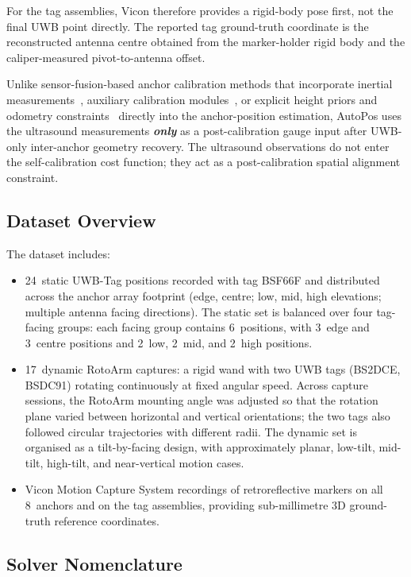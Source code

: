 \documentclass[11pt,a4paper]{article}
\begin{document}
For the tag assemblies, Vicon therefore provides a rigid-body pose first, not the final UWB point directly.
The reported tag ground-truth coordinate is the reconstructed antenna centre obtained from the marker-holder rigid body and the caliper-measured pivot-to-antenna offset.

Unlike sensor-fusion-based anchor calibration methods that incorporate inertial measurements~\cite{shi2019anchor}, auxiliary calibration modules~\cite{krapez2020anchor}, or explicit height priors and odometry constraints~\cite{nguyen2025coordinate} directly into the anchor-position estimation, AutoPos uses the ultrasound measurements \textbf{\emph{only}} as a post-calibration gauge input after UWB-only inter-anchor geometry recovery.
The ultrasound observations do not enter the self-calibration cost function; they act as a post-calibration spatial alignment constraint.

\subsection{Dataset Overview}

The dataset includes:
\begin{itemize}[nosep]
  \item 24~static UWB-Tag positions recorded with tag BSF66F and distributed across the anchor array footprint (edge, centre; low, mid, high elevations; multiple antenna facing directions).
        The static set is balanced over four tag-facing groups: each facing group contains 6~positions, with 3~edge and 3~centre positions and 2~low, 2~mid, and 2~high positions.
  \item 17~dynamic RotoArm captures: a rigid wand with two UWB tags (BS2DCE, BSDC91) rotating continuously at fixed angular speed. Across capture sessions, the RotoArm mounting angle was adjusted so that the rotation plane varied between horizontal and vertical orientations; the two tags also followed circular trajectories with different radii. The dynamic set is organised as a tilt-by-facing design, with approximately planar, low-tilt, mid-tilt, high-tilt, and near-vertical motion cases.
  \item Vicon Motion Capture System recordings of retroreflective markers on all 8~anchors and on the tag assemblies, providing sub-millimetre 3D ground-truth reference coordinates.
\end{itemize}

\subsection{Solver Nomenclature}
\label{sec:solver_nomenclature}
\end{document}
